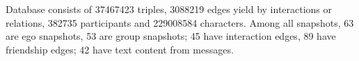 Database consists of 37467423 triples, 3088219 edges yield by interactions or relations, 382735 participants and 229008584 characters. Among all snapshots, 63 are ego snapshots, 53 are group snapshots; 45 have interaction edges, 89 have friendship edges; 42 have text content from messages.